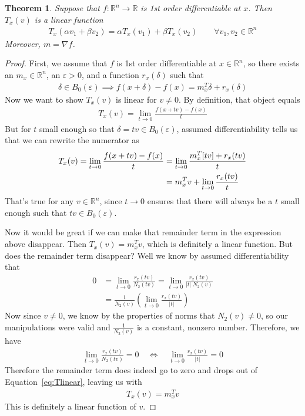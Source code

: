 \documentclass[12pt]{book}
\numberwithin{equation}{section} %
\theoremstyle{plain}
\newtheorem{thm}{Theorem}[section]
\theoremstyle{definition}
\theoremstyle{remark}
\newcommand{\R}{\mathbb{R}}
\newcommand{\Rn}{\mathbb{R}^n}
\begin{document}
\begin{thm}
Suppose that $f:\Rn\rightarrow\R$ is 1st order differentiable at $x$.
Then $T_x(v)$ is a linear function
\begin{align*}
  T_x(\alpha v_1 + \beta v_2)
  = \alpha T_x(v_1) + \beta T_x(v_2)
  \qquad \forall v_1,v_2\in\Rn
\end{align*}
Moreover, $m=\nabla f$.
\end{thm}
\begin{proof}
First, we assume that $f$ is 1st order differentiable at $x\in\Rn$, so
there exists an $m_x\in\Rn$, an $\varepsilon>0$, and a function
$r_x(\delta)$ such that
\begin{align*}
  \delta\in B_0(\varepsilon)
  \implies
  f(x+\delta) - f(x) = m_x^T \delta + r_x(\delta)
\end{align*}
Now we want to show $T_x(v)$ is linear for $v\neq 0$. By definition,
that object equals
\begin{align*}
  T_x(v) = \lim_{t\rightarrow 0} \frac{f(x+tv) - f(x)}{t}
\end{align*}
But for $t$ small enough so that $\delta=tv\in B_0(\varepsilon)$,
assumed differentiability tells us that we can rewrite the numerator as
\begin{align}
  T_x(v)
  = \lim_{t\rightarrow 0} \frac{f(x+tv) - f(x)}{t}
  &= \lim_{t\rightarrow 0} \frac{m_x^T [tv] + r_x(tv)}{t}\notag\\
  &= m_x^T v + \lim_{t\rightarrow 0} \frac{r_x(tv)}{t}
  \label{eq:Tlinear}
\end{align}
That's true for any $v\in\Rn$, since $t\rightarrow 0$ ensures that there
will always be a $t$ small enough such that $tv\in B_0(\varepsilon)$.

Now it would be great if we can make that remainder term in the
expression above disappear. Then $T_x(v)=m_x^Tv$, which is definitely a
linear function. But does the remainder term disappear?
Well we know by assumed differentiability that
\begin{align*}
  0
  &= \lim_{t\rightarrow 0} \frac{r_x(tv)}{N_2(tv)}
  = \lim_{t\rightarrow 0} \frac{r_x(tv)}{|t| \; N_2(v)}\\
  &= \frac{1}{N_2(v)}
  \left(\lim_{t\rightarrow 0} \frac{r_x(tv)}{|t|}\right)
\end{align*}
Now since $v\neq 0$, we know by the properties of norms that $N_2(v)\neq
0$, so our manipulations were valid and $\frac{1}{N_2(v)}$ is a
constant, nonzero number. Therefore, we have
\begin{align*}
  \lim_{t\rightarrow 0} \frac{r_x(tv)}{N_2(tv)} = 0
  \quad\iff\quad
  \lim_{t\rightarrow 0} \frac{r_x(tv)}{|t|} = 0
\end{align*}
Therefore the remainder term does indeed go to zero and drops out of
Equation~\ref{eq:Tlinear}, leaving us with
\begin{align*}
  T_x(v) = m_x^T v
\end{align*}
This is definitely a linear function of $v$.


\end{proof}
\end{document}
